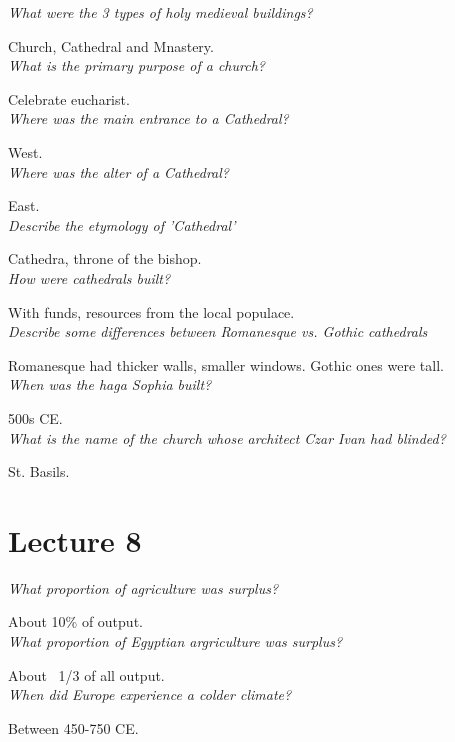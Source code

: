 \documentclass[12pt]{article}
\begin{document}
\textit{What were the 3 types of holy medieval buildings?}

Church, Cathedral and Mnastery.\\

\textit{What is the primary purpose of a church?}

Celebrate eucharist.\\

\textit{Where was the main entrance to a Cathedral?}

West.\\

\textit{Where was the alter of a Cathedral?}

East.\\

\textit{Describe the etymology of 'Cathedral'}

Cathedra, throne of the bishop.\\

\textit{How were cathedrals built?}

With funds, resources from the local populace.\\

\textit{Describe some differences between Romanesque vs. Gothic cathedrals}

Romanesque had thicker walls, smaller windows. Gothic ones were tall.\\

\textit{When was the haga Sophia built?}

500s CE.\\

\textit{What is the name of the church whose architect Czar Ivan had blinded?}

St. Basils.\\

\section*{Lecture 8}

\textit{What proportion of agriculture was surplus?}

About 10\% of output.\\

\textit{What proportion of Egyptian argriculture was surplus?}

About ~1/3 of all output.\\

\textit{When did Europe experience a colder climate?}

Between 450-750 CE.\\
\end{document}

